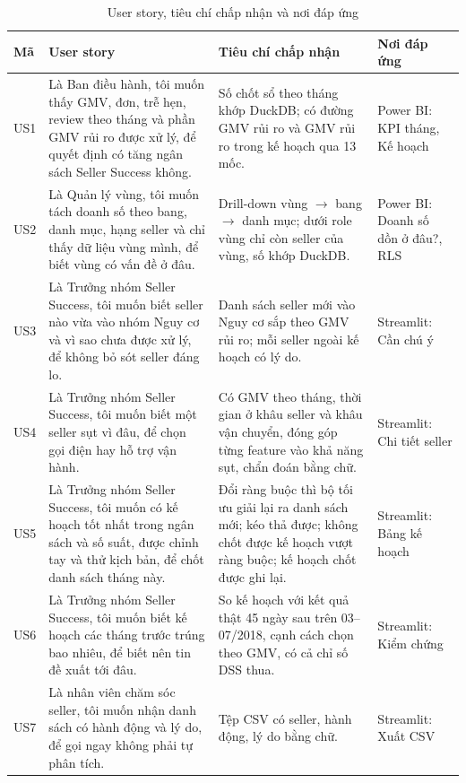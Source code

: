 \begin{table}[htbp]
\centering
\footnotesize
\caption{User story, tiêu chí chấp nhận và nơi đáp ứng}
\label{tab:user_stories}
\begin{tabularx}{\textwidth}{|>{\centering\arraybackslash}m{0.75cm}|>{\raggedright\arraybackslash}m{5.0cm}|L|>{\raggedright\arraybackslash}m{2.5cm}|}
\hline
\textbf{Mã} & \textbf{User story} & \textbf{Tiêu chí chấp nhận} & \textbf{Nơi đáp ứng} \\
\hline
US1 & Là Ban điều hành, tôi muốn thấy GMV, đơn, trễ hẹn, review theo tháng và phần GMV rủi ro được xử lý, để quyết định có tăng ngân sách Seller Success không. & Số chốt sổ theo tháng khớp DuckDB; có đường GMV rủi ro và GMV rủi ro trong kế hoạch qua 13 mốc. & Power BI: KPI tháng, Kế hoạch \\
\hline
US2 & Là Quản lý vùng, tôi muốn tách doanh số theo bang, danh mục, hạng seller và chỉ thấy dữ liệu vùng mình, để biết vùng có vấn đề ở đâu. & Drill-down vùng $\rightarrow$ bang $\rightarrow$ danh mục; dưới role vùng chỉ còn seller của vùng, số khớp DuckDB. & Power BI: Doanh số dồn ở đâu?, RLS \\
\hline
US3 & Là Trưởng nhóm Seller Success, tôi muốn biết seller nào vừa vào nhóm Nguy cơ và vì sao chưa được xử lý, để không bỏ sót seller đáng lo. & Danh sách seller mới vào Nguy cơ sắp theo GMV rủi ro; mỗi seller ngoài kế hoạch có lý do. & Streamlit: Cần chú ý \\
\hline
US4 & Là Trưởng nhóm Seller Success, tôi muốn biết một seller sụt vì đâu, để chọn gọi điện hay hỗ trợ vận hành. & Có GMV theo tháng, thời gian ở khâu seller và khâu vận chuyển, đóng góp từng feature vào khả năng sụt, chẩn đoán bằng chữ. & Streamlit: Chi tiết seller \\
\hline
US5 & Là Trưởng nhóm Seller Success, tôi muốn có kế hoạch tốt nhất trong ngân sách và số suất, được chỉnh tay và thử kịch bản, để chốt danh sách tháng này. & Đổi ràng buộc thì bộ tối ưu giải lại ra danh sách mới; kéo thả được; không chốt được kế hoạch vượt ràng buộc; kế hoạch chốt được ghi lại. & Streamlit: Bảng kế hoạch \\
\hline
US6 & Là Trưởng nhóm Seller Success, tôi muốn biết kế hoạch các tháng trước trúng bao nhiêu, để biết nên tin đề xuất tới đâu. & So kế hoạch với kết quả thật 45 ngày sau trên 03--07/2018, cạnh cách chọn theo GMV, có cả chỉ số DSS thua. & Streamlit: Kiểm chứng \\
\hline
US7 & Là nhân viên chăm sóc seller, tôi muốn nhận danh sách có hành động và lý do, để gọi ngay không phải tự phân tích. & Tệp CSV có seller, hành động, lý do bằng chữ. & Streamlit: Xuất CSV \\

\end{tabularx}
\end{table}
